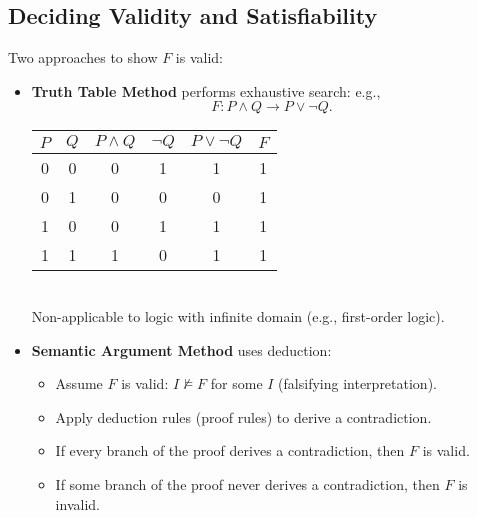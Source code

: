 \subsection{Deciding Validity and Satisfiability}
Two approaches to show $F$ is valid:
\begin{itemize}
	\item \textbf{Truth Table Method} performs exhaustive search: e.g., \[
	F:P\land Q\to P\lor\lnot Q.
	\]
	\begin{table}[h!]\centering
		\begin{tabular}{c|c|c|c|c||c}
			\hline
			$P$ & $Q$ & $P\land Q$ & $\lnot Q$ & $P\lor\lnot Q$ & $F$ \\ \hline
			0 & 0 & 0 & 1 & 1 & 1 \\
			0 & 1 & 0 & 0 & 0 & 1 \\
			1 & 0 & 0 & 1 & 1 & 1 \\
			1 & 1 & 1 & 0 & 1 & 1 \\ \hline
		\end{tabular}
	\end{table} \\
	Non-applicable to logic with infinite domain (e.g., first-order logic).
	\item \textbf{Semantic Argument Method} uses deduction:
	\begin{itemize}
		\item Assume $F$ is valid: $I\not\models F$ for some $I$ (falsifying interpretation).
		\item Apply deduction rules (proof rules) to derive a contradiction.
		\item If every branch of the proof derives a contradiction, then $F$ is valid.
		\item If some branch of the proof never derives a contradiction, then $F$ is invalid.
	\end{itemize}
\end{itemize}

